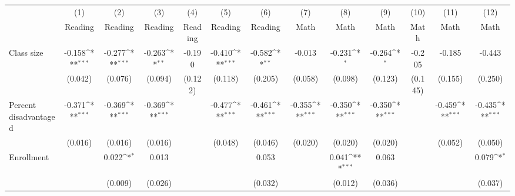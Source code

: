 {
\def\sym#1{\ifmmode^{#1}\else\(^{#1}\)\fi}
\begin{tabular}{l*{12}{c}}
\toprule
            &\multicolumn{1}{c}{(1)}&\multicolumn{1}{c}{(2)}&\multicolumn{1}{c}{(3)}&\multicolumn{1}{c}{(4)}&\multicolumn{1}{c}{(5)}&\multicolumn{1}{c}{(6)}&\multicolumn{1}{c}{(7)}&\multicolumn{1}{c}{(8)}&\multicolumn{1}{c}{(9)}&\multicolumn{1}{c}{(10)}&\multicolumn{1}{c}{(11)}&\multicolumn{1}{c}{(12)}\\
            &\multicolumn{1}{c}{Reading}&\multicolumn{1}{c}{Reading}&\multicolumn{1}{c}{Reading}&\multicolumn{1}{c}{Reading}&\multicolumn{1}{c}{Reading}&\multicolumn{1}{c}{Reading}&\multicolumn{1}{c}{Math}&\multicolumn{1}{c}{Math}&\multicolumn{1}{c}{Math}&\multicolumn{1}{c}{Math}&\multicolumn{1}{c}{Math}&\multicolumn{1}{c}{Math}\\
\midrule
Class size  &      -0.158\sym{***}&      -0.277\sym{***}&      -0.263\sym{**} &      -0.190         &      -0.410\sym{***}&      -0.582\sym{**} &      -0.013         &      -0.231\sym{*}  &      -0.264\sym{*}  &      -0.205         &      -0.185         &      -0.443         \\
            &     (0.042)         &     (0.076)         &     (0.094)         &     (0.122)         &     (0.118)         &     (0.205)         &     (0.058)         &     (0.098)         &     (0.123)         &     (0.145)         &     (0.155)         &     (0.250)         \\
\addlinespace
Percent disadvantaged&      -0.371\sym{***}&      -0.369\sym{***}&      -0.369\sym{***}&                     &      -0.477\sym{***}&      -0.461\sym{***}&      -0.355\sym{***}&      -0.350\sym{***}&      -0.350\sym{***}&                     &      -0.459\sym{***}&      -0.435\sym{***}\\
            &     (0.016)         &     (0.016)         &     (0.016)         &                     &     (0.048)         &     (0.046)         &     (0.020)         &     (0.020)         &     (0.020)         &                     &     (0.052)         &     (0.050)         \\
\addlinespace
Enrollment  &                     &       0.022\sym{*}  &       0.013         &                     &                     &       0.053         &                     &       0.041\sym{***}&       0.063         &                     &                     &       0.079\sym{*}  \\
            &                     &     (0.009)         &     (0.026)         &                     &                     &     (0.032)         &                     &     (0.012)         &     (0.036)         &                     &                     &     (0.037)         \\

\end{tabular}}
